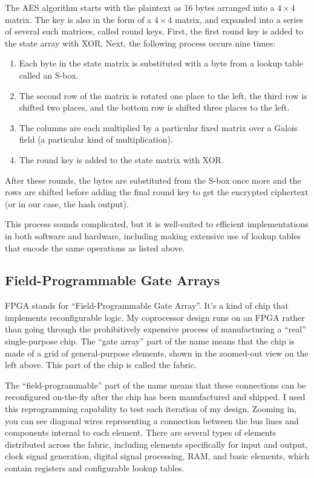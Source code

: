 The AES algorithm starts with the plaintext as 16 bytes arranged into a $4\times4$ matrix. The key is also in the form of a $4\times4$ matrix, and expanded into a series of several such matrices, called round keys. First, the first round key is added to the state array with XOR. Next, the following process occurs nine times:

\begin{enumerate}
	\item Each byte in the state matrix is substituted with a byte from a lookup table called an S-box.
	\item The second row of the matrix is rotated one place to the left, the third row is shifted two places, and the bottom row is shifted three places to the left.
	\item The columns are each multiplied by a particular fixed matrix over a Galois field (a particular kind of multiplication).
	\item The round key is added to the state matrix with XOR.
\end{enumerate}

After these rounds, the bytes are substituted from the S-box once more and the rows are shifted before adding the final round key to get the encrypted ciphertext (or in our case, the hash output).

This process sounds complicated, but it is well-suited to efficient implementations in both software and hardware, including making extensive use of lookup tables that encode the same operations as listed above.

\subsection{Field-Programmable Gate Arrays}
FPGA stands for ``Field-Programmable Gate Array''. It's a kind of chip that implements reconfigurable logic. My coprocessor design runs on an FPGA rather than going through the prohibitively expensive process of manufacturing a ``real'' single-purpose chip. The ``gate array'' part of the name means that the chip is made of a grid of general-purpose elements, shown in the zoomed-out view on the left above. This part of the chip is called the fabric.

The ``field-programmable'' part of the name means that these connections can be reconfigured on-the-fly after the chip has been manufactured and shipped. I used this reprogramming capability to test each iteration of my design. Zooming in, you can see diagonal wires representing a connection between the bus lines and components internal to each element. There are several types of elements distributed across the fabric, including elements specifically for input and output, clock signal generation, digital signal processing, RAM, and basic elements, which contain registers and configurable lookup tables.

